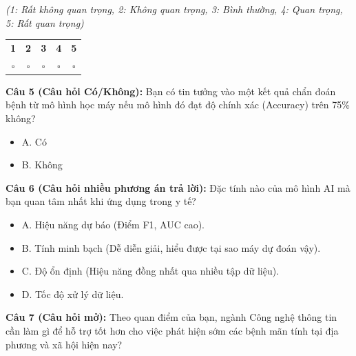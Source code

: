 \documentclass[14pt,a4paper]{extreport}
\begin{document}
\noindent\textit{(1: Rất không quan trọng, 2: Không quan trọng, 3: Bình thường, 4: Quan trọng, 5: Rất quan trọng)}

\begin{center}
\begin{tabular}{ccccc}
  \textbf{1} & \textbf{2} & \textbf{3} & \textbf{4} & \textbf{5} \\
  $\square$ & $\square$ & $\square$ & $\square$ & $\square$ \\
\end{tabular}
\end{center}

\noindent{}

\vspace{0.3cm}

\noindent\textbf{Câu 5 (Câu hỏi Có/Không):} Bạn có tin tưởng vào một kết quả chẩn đoán bệnh từ mô hình học máy nếu mô hình đó đạt độ chính xác (Accuracy) trên 75\% không?
\begin{itemize}
  \item[$\square$] A. Có
  \item[$\square$] B. Không
\end{itemize}

\vspace{0.3cm}

\noindent\textbf{Câu 6 (Câu hỏi nhiều phương án trả lời):} Đặc tính nào của mô hình AI mà bạn quan tâm nhất khi ứng dụng trong y tế?
\begin{itemize}
  \item[$\square$] A. Hiệu năng dự báo (Điểm F1, AUC cao).
  \item[$\square$] B. Tính minh bạch (Dễ diễn giải, hiểu được tại sao máy dự đoán vậy).
  \item[$\square$] C. Độ ổn định (Hiệu năng đồng nhất qua nhiều tập dữ liệu).
  \item[$\square$] D. Tốc độ xử lý dữ liệu.
\end{itemize}

\vspace{0.3cm}

\noindent\textbf{Câu 7 (Câu hỏi mở):} Theo quan điểm của bạn, ngành Công nghệ thông tin cần làm gì để hỗ trợ tốt hơn cho việc phát hiện sớm các bệnh mãn tính tại địa phương và xã hội hiện nay?
\end{document}
